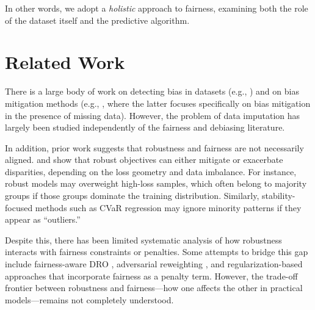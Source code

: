\documentclass{article}
\begin{document}
In other words, we adopt a \textit{holistic} approach to fairness, examining both the role of the dataset itself and the predictive algorithm.

\section{Related Work}
\par \par There is a large body of work on detecting bias in datasets (e.g., \cite{engstrom2020identifyingstatisticalbiasdataset}) and on bias mitigation methods (e.g., \cite{jain2024datadebiasingdatamodelsd3m, celentano2023challengesinconsistencyregimenovel}, where the latter focuses specifically on bias mitigation in the presence of missing data). However, the problem of data imputation has largely been studied independently of the fairness and debiasing literature.
\par In addition, prior work suggests that robustness and fairness are not necessarily aligned. \citet{hashimoto2018fairness} and \citet{iosifidis2020fairness} show that robust objectives can either mitigate or exacerbate disparities, depending on the loss geometry and data imbalance. For instance, robust models may overweight high-loss samples, which often belong to majority groups if those groups dominate the training distribution. Similarly, stability-focused methods such as CVaR regression may ignore minority patterns if they appear as ``outliers.''

Despite this, there has been limited systematic analysis of how robustness interacts with fairness constraints or penalties. Some attempts to bridge this gap include fairness-aware DRO \citep{chiang2020fairness, wadsworth2018achieving}, adversarial reweighting \citep{zhang2018mitigating}, and regularization-based approaches that incorporate fairness as a penalty term. However, the trade-off frontier between robustness and fairness—how one affects the other in practical models—remains not completely understood.



\end{document}
